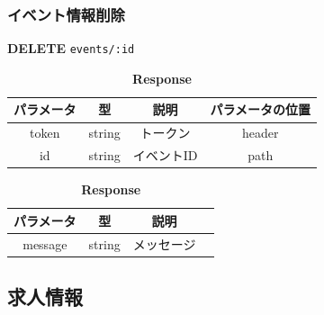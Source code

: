 \subsubsection*{イベント情報削除}
\textbf{DELETE} \texttt{events/:id}
\begin{table}[H]
  \begin{minipage}
    {0.5\hsize} \centering \captionsetup{labelformat=empty,labelsep=none}
    \caption{\textbf{Request}}
    \begin{tabular}{|c|c|c|c|} \hline
      パラメータ & 型      & 説明     & パラメータの位置 \\ \hline \hline
      token & string & トークン   & header   \\ \hline
      id    & string & イベントID & path     \\ \hline
    \end{tabular}
  \end{minipage}
  \begin{minipage}
    {0.5\hsize} \centering \captionsetup{labelformat=empty,labelsep=none}
    \caption{\textbf{Response}}
    \begin{tabular}{|c|c|c|c|} \hline
      パラメータ   & 型      & 説明    \\ \hline \hline
      message & string & メッセージ \\ \hline
    \end{tabular}
  \end{minipage}
\end{table}
\hrulefill
\subsection{求人情報}
